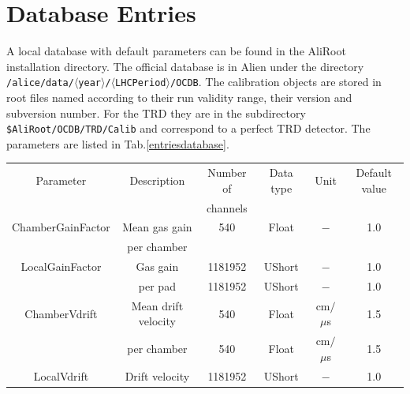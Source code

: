\documentclass{alicetdr}
\begin{document}
\section{Database Entries}
A local database with default parameters can be found in the AliRoot 
installation directory. The official database is in Alien under the 
directory 
{\tt /alice/data/$\langle$year$\rangle$/$\langle$LHCPeriod$\rangle$/OCDB}. 
The calibration objects are stored in root files named according to their 
run validity range, their version and subversion number. For the TRD they 
are in the subdirectory {\tt \$AliRoot/OCDB/TRD/Calib} and correspond to 
a perfect TRD detector. The parameters are listed in Tab.\ref{entriesdatabase}.\\  
\begin{table} [h]
  \begin{center}
    \begin{tabular}{|c|c|c|c|c|c|}
      \hline Parameter                  & Description                                        & Number of         & Data type  & Unit & Default value \\ 
                                        &                                                    & channels          &            &  &  \\ \hline
      ChamberGainFactor                 & Mean gas gain                                      & 540               & Float      & $-$  & 1.0          \\ 
      $ $                               & per chamber                                        &                   &            &  &          \\ \hline
      LocalGainFactor                   & Gas gain                                           & 1181952           & UShort     & $-$  & 1.0   \\ 
                                        & per pad                                            & 1181952           & UShort     & $-$  & 1.0   \\ \hline
      ChamberVdrift                     & Mean drift velocity                                & 540               & Float      & cm$/$$\mu$s & 1.5 \\ 
                                        & per chamber                                        & 540               & Float      & cm$/$$\mu$s & 1.5 \\ \hline
      LocalVdrift                       & Drift velocity                                     & 1181952           & UShort     & $-$ & 1.0  \\ 

\end{tabular}
\end{center}
\end{table}
\end{document}
